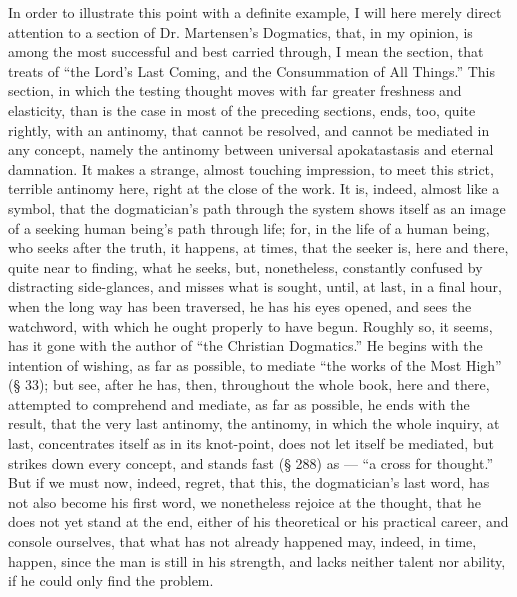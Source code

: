 \documentclass[12pt]{book}
\begin{document}
In order to illustrate this point with a definite example, I will here merely direct attention to a section of Dr. Martensen's Dogmatics, that, in my opinion, is among the most successful and best carried through, I mean the section, that treats of ``the Lord's Last Coming, and the Consummation of All Things.'' This section, in which the testing thought moves with far greater freshness and elasticity, than is the case in most of the preceding sections, ends, too, quite rightly, with an antinomy, that cannot be resolved, and cannot be mediated in any concept, namely the antinomy between universal apokatastasis and eternal damnation. It makes a strange, almost touching impression, to meet this strict, terrible antinomy here, right at the close of the work. It is, indeed, almost like a symbol, that the dogmatician's path through the system shows itself as an image of a seeking human being's path through life; for, in the life of a human being, who seeks after the truth, it happens, at times, that the seeker is, here and there, quite near to finding, what he seeks, but, nonetheless, constantly confused by distracting side-glances, and misses what is sought, until, at last, in a final hour, when the long way has been traversed, he has his eyes opened, and sees the watchword, with which he ought properly to have begun. Roughly so, it seems, has it gone with the author of ``the Christian
Dogmatics.'' He begins with the intention of wishing, as far as possible, to mediate ``the works of the Most High'' (§ 33); but see, after he has, then, throughout the whole book, here and there, attempted to comprehend and mediate, as far as possible, he ends with the result, that the very last antinomy, the antinomy, in which the whole inquiry, at last, concentrates itself as in its knot-point, does not let itself be mediated, but strikes down every concept, and stands fast (§ 288) as --- ``a cross for thought.'' But if we must now, indeed, regret, that this, the dogmatician's last word, has not also become his first word, we nonetheless rejoice at the thought, that he does not yet stand at the end, either of his theoretical or his practical career, and console ourselves, that what has not already happened may, indeed, in time, happen, since the man is still in his strength, and lacks neither talent nor ability, if he could only find the problem.
\end{document}
